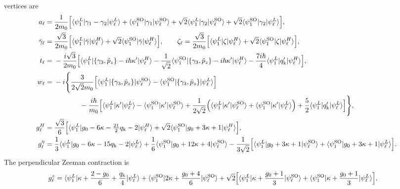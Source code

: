 \documentclass[10pt,letterpaper]{article}
\newcommand{\mel}[3]{\langle #1\vert #2\vert #3\rangle}
\newcommand{\qq}{q_{\mathrm k}}
\newcommand{\SO}{\mathrm{SO}}
\begin{document}
vertices are
\begin{align}
 a_\ell={}&\frac{1}{2m_0}\Bigl[
 \mel{\psi_1^L}{\gamma_1-\gamma_2}{\psi_\ell^L}
 +\mel{\psi_1^{\SO}}{\gamma_1}{\psi_\ell^{\SO}}
 +\sqrt2\mel{\psi_1^L}{\gamma_2}{\psi_\ell^{\SO}}
 +\sqrt2\mel{\psi_1^{\SO}}{\gamma_2}{\psi_\ell^L}
 \Bigr],\label{eq:swt6-a}\\
 \bar\gamma_\ell={}&\frac{\sqrt3}{2m_0}\Bigl[
 \mel{\psi_1^L}{\bar\gamma}{\psi_\ell^H}
 +\sqrt2\mel{\psi_1^{\SO}}{\bar\gamma}{\psi_\ell^H}
 \Bigr],\qquad
 \zeta_\ell=\frac{\sqrt3}{2m_0}\Bigl[
 \mel{\psi_1^L}{\zeta}{\psi_\ell^H}
 +\sqrt2\mel{\psi_1^{\SO}}{\zeta}{\psi_\ell^H}
 \Bigr],\label{eq:swt6-R}\\
 t_\ell={}&-\frac{i\sqrt3}{2m_0}\Bigl[
 \mel{\psi_1^L}{\{\gamma_3,\hat p_z\}-i\hbar\kappa'}{\psi_\ell^H}
 -\frac1{\sqrt2}
 \mel{\psi_1^{\SO}}{\{\gamma_3,\hat p_z\}-i\hbar\kappa'}{\psi_\ell^H}
 -\frac{7i\hbar}{4}\mel{\psi_1^L}{\qq'}{\psi_\ell^H}
 \Bigr],\label{eq:swt6-t}\\
 w_\ell={}&-i\Bigg\{
 \frac{3}{2\sqrt2m_0}\Bigl[
 \mel{\psi_1^L}{\{\gamma_3,\hat p_z\}}{\psi_\ell^{\SO}}
 -\mel{\psi_1^{\SO}}{\{\gamma_3,\hat p_z\}}{\psi_\ell^L}
 \Bigr]\nonumber\\
 &\hspace{1.3cm}-\frac{i\hbar}{m_0}\Bigl[
 \mel{\psi_1^L}{\kappa'}{\psi_\ell^L}
 -\mel{\psi_1^{\SO}}{\kappa'}{\psi_\ell^{\SO}}
 +\frac{1}{2\sqrt2}\Bigl(
 \mel{\psi_1^L}{\kappa'}{\psi_\ell^{\SO}}
 +\mel{\psi_1^{\SO}}{\kappa'}{\psi_\ell^L}\Bigr)
 +\frac52\mel{\psi_1^L}{\qq'}{\psi_\ell^L}
 \Bigr]\Bigg\},\label{eq:swt6-w}\\
 g_\ell^H={}&\frac{\sqrt3}{6}\Bigl[
 \mel{\psi_1^L}{g_0-6\kappa-\tfrac{21}{2}\qq-2}{\psi_\ell^H}
 +\sqrt2\mel{\psi_1^{\SO}}{g_0+3\kappa+1}{\psi_\ell^H}
 \Bigr],\label{eq:swt6-gH}\\
 g_\ell^\eta={}&
 \frac13\mel{\psi_1^L}{g_0-6\kappa-15\qq-2}{\psi_\ell^L}
 +\frac16\mel{\psi_1^{\SO}}{g_0+12\kappa+4}{\psi_\ell^{\SO}}
 -\frac{1}{3\sqrt2}\Bigl[
 \mel{\psi_1^L}{g_0+3\kappa+1}{\psi_\ell^{\SO}}
 +\mel{\psi_1^{\SO}}{g_0+3\kappa+1}{\psi_\ell^L}
 \Bigr].\label{eq:swt6-geta}
\end{align}
The perpendicular Zeeman contraction is
\begin{align}
 g_\ell^z={}&
 \mel{\psi_1^L}{\kappa+\frac{2-g_0}{6}+\frac{\qq}{4}}{\psi_\ell^L}
 +\mel{\psi_1^{\SO}}{2\kappa+\frac{g_0+4}{6}}{\psi_\ell^{\SO}}
 +\sqrt2\Bigl[
 \mel{\psi_1^L}{\kappa+\frac{g_0+1}{3}}{\psi_\ell^{\SO}}
 +\mel{\psi_1^{\SO}}{\kappa+\frac{g_0+1}{3}}{\psi_\ell^L}
 \Bigr].\label{eq:swt6-gz}
\end{align}
\end{document}
